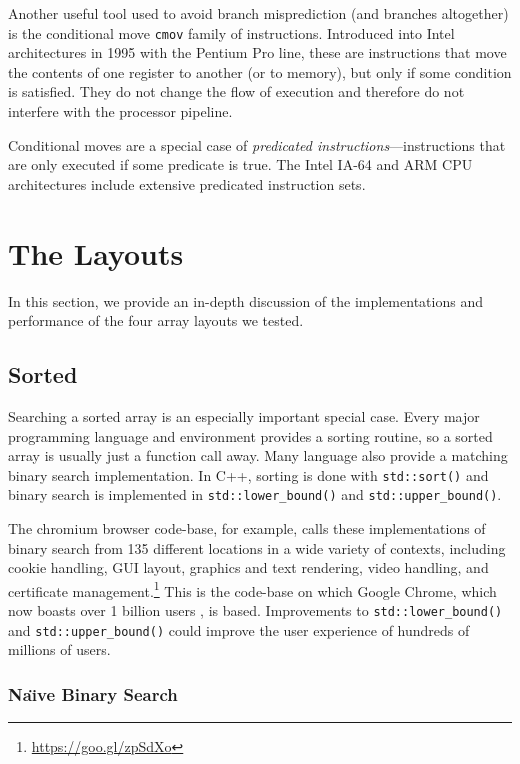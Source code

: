 \documentclass{patmorin}
\begin{document}
Another useful tool used to avoid branch misprediction (and branches
altogether) is the conditional move \texttt{cmov} family
of instructions.  Introduced into Intel architectures in 1995 with
the Pentium Pro line, these are instructions that move the contents of
one register to another (or to memory), but only if some condition is
satisfied. They do not change the flow of execution and therefore do
not interfere with the processor pipeline.

Conditional moves are a special case of \emph{predicated
instructions}---instructions that are only executed if some predicate
is true.  The Intel IA-64 and ARM CPU architectures include extensive
predicated instruction sets.

\section{The Layouts}

In this section, we provide an in-depth discussion of the implementations
and performance of the four array layouts we tested.

\subsection{Sorted}

Searching a sorted array is an especially important special case. Every
major programming language and environment provides a sorting routine,
so a sorted array is usually just a function call away. Many language
also provide a matching binary search implementation.  In C++,
sorting is done with \texttt{std::sort()} and binary
search is implemented in \texttt{std::lower_bound()} and
\texttt{std::upper_bound()}. 

The chromium browser code-base, for example, calls these
implementations of binary search from 135 different locations
in a wide variety of contexts, including cookie handling, GUI
layout, graphics and text rendering, video handling, and certificate
management.\footnote{\url{https://goo.gl/zpSdXo}}  This is the code-base
on which Google Chrome, which now boasts over 1 billion users \cite{X}, is
based. Improvements to \texttt{std::lower_bound()}
and \texttt{std::upper_bound()} could improve the user experience
of hundreds of millions of users.

\subsubsection{Na\"{\i}ve Binary Search}
\end{document}
